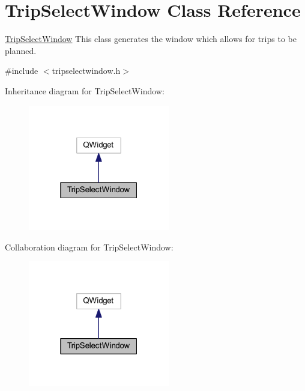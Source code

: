 \hypertarget{class_trip_select_window}{}\section{Trip\+Select\+Window Class Reference}
\label{class_trip_select_window}


\mbox{\hyperlink{class_trip_select_window}{Trip\+Select\+Window}} This class generates the window which allows for trips to be planned.  




{\ttfamily \#include $<$tripselectwindow.\+h$>$}



Inheritance diagram for Trip\+Select\+Window\+:\nopagebreak
\begin{figure}[H]
\begin{center}
\leavevmode
\includegraphics[width=175pt]{class_trip_select_window__inherit__graph}
\end{center}
\end{figure}


Collaboration diagram for Trip\+Select\+Window\+:\nopagebreak
\begin{figure}[H]
\begin{center}
\leavevmode
\includegraphics[width=175pt]{class_trip_select_window__coll__graph}
\end{center}
\end{figure}
